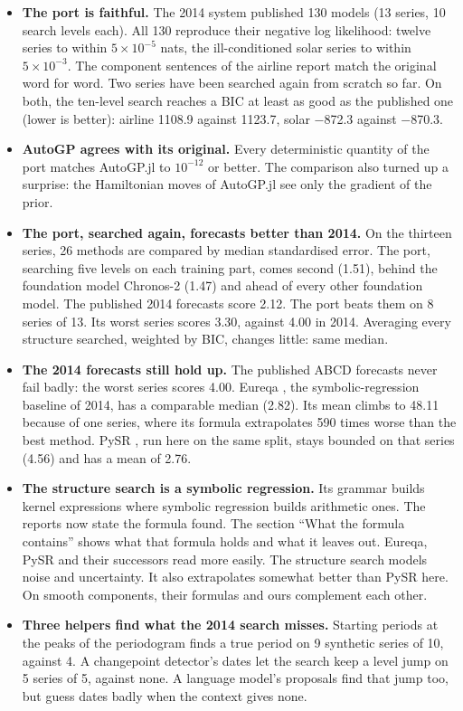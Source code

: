 \documentclass[
]{article}
\providecommand{\tightlist}{%
  \setlength{\itemsep}{0pt}\setlength{\parskip}{0pt}}
\begin{document}
\begin{itemize}
\tightlist
\item
  \textbf{The port is faithful.} The 2014 system published 130 models
  (13 series, 10 search levels each). All 130 reproduce their negative
  log likelihood: twelve series to within \(5\times10^{-5}\) nats, the
  ill-conditioned solar series to within \(5\times10^{-3}\). The
  component sentences of the airline report match the original word for
  word. Two series have been searched again from scratch so far. On
  both, the ten-level search reaches a BIC at least as good as the
  published one (lower is better): airline 1108.9 against 1123.7, solar
  −872.3 against −870.3.
\item
  \textbf{AutoGP agrees with its original.} Every deterministic quantity
  of the port matches AutoGP.jl to \(10^{-12}\) or better. The
  comparison also turned up a surprise: the Hamiltonian moves of
  AutoGP.jl see only the gradient of the prior.
\item
  \textbf{The port, searched again, forecasts better than 2014.} On the
  thirteen series, 26 methods are compared by median standardised error.
  The port, searching five levels on each training part, comes second
  (1.51), behind the foundation model Chronos-2 (1.47)
  \autocite{ansari2025chronos2} and ahead of every other foundation
  model. The published 2014 forecasts score 2.12. The port beats them on
  8 series of 13. Its worst series scores 3.30, against 4.00 in 2014.
  Averaging every structure searched, weighted by BIC, changes little:
  same median.
\item
  \textbf{The 2014 forecasts still hold up.} The published ABCD
  forecasts never fail badly: the worst series scores 4.00. Eureqa
  \autocite{schmidt2009distilling}, the symbolic-regression baseline of
  2014, has a comparable median (2.82). Its mean climbs to 48.11 because
  of one series, where its formula extrapolates 590 times worse than the
  best method. PySR \autocite{cranmer2023pysr}, run here on the same
  split, stays bounded on that series (4.56) and has a mean of 2.76.
\item
  \textbf{The structure search is a symbolic regression.} Its grammar
  builds kernel expressions where symbolic regression builds arithmetic
  ones. The reports now state the formula found. The section ``What the
  formula contains'' shows what that formula holds and what it leaves
  out. Eureqa, PySR and their successors read more easily. The structure
  search models noise and uncertainty. It also extrapolates somewhat
  better than PySR here. On smooth components, their formulas and ours
  complement each other.
\item
  \textbf{Three helpers find what the 2014 search misses.} Starting
  periods at the peaks of the periodogram finds a true period on 9
  synthetic series of 10, against 4. A changepoint detector's dates let
  the search keep a level jump on 5 series of 5, against none. A
  language model's proposals find that jump too, but guess dates badly
  when the context gives none.
\end{itemize}
\end{document}
